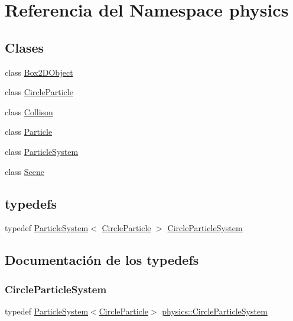 \hypertarget{namespacephysics}{}\section{Referencia del Namespace physics}
\label{namespacephysics}
\subsection*{Clases}
\begin{DoxyCompactItemize}
\item 
class \mbox{\hyperlink{classphysics_1_1_box2_d_object}{Box2\+D\+Object}}
\item 
class \mbox{\hyperlink{classphysics_1_1_circle_particle}{Circle\+Particle}}
\item 
class \mbox{\hyperlink{classphysics_1_1_collison}{Collison}}
\item 
class \mbox{\hyperlink{classphysics_1_1_particle}{Particle}}
\item 
class \mbox{\hyperlink{classphysics_1_1_particle_system}{Particle\+System}}
\item 
class \mbox{\hyperlink{classphysics_1_1_scene}{Scene}}
\end{DoxyCompactItemize}
\subsection*{typedefs}
\begin{DoxyCompactItemize}
\item 
typedef \mbox{\hyperlink{classphysics_1_1_particle_system}{Particle\+System}}$<$ \mbox{\hyperlink{classphysics_1_1_circle_particle}{Circle\+Particle}} $>$ \mbox{\hyperlink{namespacephysics_a962adae29e6ee31067fabcf90eb01dac}{Circle\+Particle\+System}}
\end{DoxyCompactItemize}


\subsection{Documentación de los \textquotesingle{}typedefs\textquotesingle{}}
\mbox{\label{namespacephysics_a962adae29e6ee31067fabcf90eb01dac}} 
\subsubsection{\texorpdfstring{Circle\+Particle\+System}{CircleParticleSystem}}
{\footnotesize\ttfamily typedef \mbox{\hyperlink{classphysics_1_1_particle_system}{Particle\+System}}$<$\mbox{\hyperlink{classphysics_1_1_circle_particle}{Circle\+Particle}}$>$ \mbox{\hyperlink{namespacephysics_a962adae29e6ee31067fabcf90eb01dac}{physics\+::\+Circle\+Particle\+System}}}

